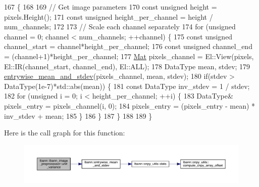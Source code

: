 \begin{DoxyCode}
167                                       \{
168 
169   \textcolor{comment}{// Get image parameters}
170   \textcolor{keyword}{const} \textcolor{keywordtype}{unsigned} height = pixels.Height();
171   \textcolor{keyword}{const} \textcolor{keywordtype}{unsigned} height\_per\_channel = height / num\_channels;
172 
173   \textcolor{comment}{// Scale each channel separately}
174   \textcolor{keywordflow}{for} (\textcolor{keywordtype}{unsigned} channel = 0; channel < num\_channels; ++channel) \{
175     \textcolor{keyword}{const} \textcolor{keywordtype}{unsigned} channel\_start = channel*height\_per\_channel;
176     \textcolor{keyword}{const} \textcolor{keywordtype}{unsigned} channel\_end = (channel+1)*height\_per\_channel;
177     \hyperlink{base_8hpp_a68f11fdc31b62516cb310831bbe54d73}{Mat} pixels\_channel = El::View(pixels, El::IR(channel\_start, channel\_end), El::ALL);
178     DataType mean, stdev;
179     \hyperlink{namespacelbann_a604ae9da0173b8be2bfb6877997d6d5c}{entrywise\_mean\_and\_stdev}(pixels\_channel, mean, stdev);
180     \textcolor{keywordflow}{if}(stdev > DataType(1e-7)*std::abs(mean)) \{
181       \textcolor{keyword}{const} DataType inv\_stdev = 1 / stdev;
182       \textcolor{keywordflow}{for} (\textcolor{keywordtype}{unsigned} i = 0; i < height\_per\_channel; ++i) \{
183         DataType& pixels\_entry = pixels\_channel(i, 0);
184         pixels\_entry = (pixels\_entry - mean) * inv\_stdev + mean;
185       \}
186     \}
187   \}
188 
189 \}
\end{DoxyCode}
Here is the call graph for this function\+:\nopagebreak
\begin{figure}[H]
\begin{center}
\leavevmode
\includegraphics[width=350pt]{classlbann_1_1lbann__image__preprocessor_af9fcb483843230008a53d60c12975f61_cgraph}
\end{center}
\end{figure}
\mbox{\label{classlbann_1_1lbann__image__preprocessor_aeb7d75e4d3361ae2836afabc14510d74}} 
